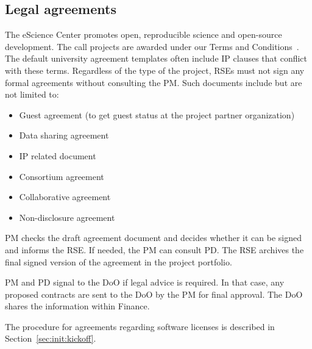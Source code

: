 \subsection{Legal agreements}
\label{sec:init:legal}
The eScience Center promotes open, reproducible science and open-source development. The call projects are awarded under our Terms and Conditions~\cite{nlesc-terms}. 
The default university agreement templates often include IP clauses that conflict with these terms. 
% 
Regardless of the type of the project, RSEs must not sign any formal agreements without consulting the PM. Such
documents include but are not limited to:
\begin{itemize}
\item Guest agreement (to get guest status at the project partner organization)
\item Data sharing agreement
\item IP related document
\item Consortium agreement
\item Collaborative agreement
\item Non-disclosure agreement
\end{itemize}

PM checks the draft agreement document and decides whether it can be signed and informs the RSE. If needed, the PM can
consult PD. The RSE archives the final signed version of the agreement in the project portfolio.

PM and PD signal to the DoO if legal advice is required. In that case, any proposed contracts are sent to the DoO by the
PM for final approval. The DoO shares the information within Finance.

The procedure for agreements regarding software licenses is described in Section~\ref{sec:init:kickoff}.
